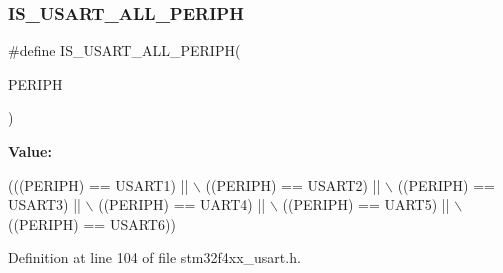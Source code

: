 \subsubsection{\texorpdfstring{I\+S\+\_\+\+U\+S\+A\+R\+T\+\_\+\+A\+L\+L\+\_\+\+P\+E\+R\+I\+PH}{IS\_USART\_ALL\_PERIPH}}
{\footnotesize\ttfamily \#define I\+S\+\_\+\+U\+S\+A\+R\+T\+\_\+\+A\+L\+L\+\_\+\+P\+E\+R\+I\+PH(\begin{DoxyParamCaption}\item[{}]{P\+E\+R\+I\+PH }\end{DoxyParamCaption})}

{\bfseries Value\+:}
\begin{DoxyCode}
(((PERIPH) == USART1) || \(\backslash\)
                                     ((PERIPH) == USART2) || \(\backslash\)
                                     ((PERIPH) == USART3) || \(\backslash\)
                                     ((PERIPH) == UART4)  || \(\backslash\)
                                     ((PERIPH) == UART5)  || \(\backslash\)
                                     ((PERIPH) == USART6))
\end{DoxyCode}


Definition at line 104 of file stm32f4xx\+\_\+usart.\+h.

